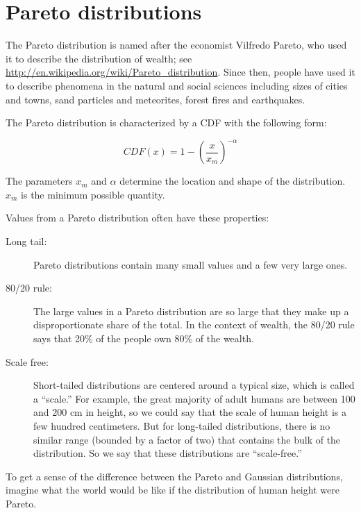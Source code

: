 \documentclass[10pt]{book}
\begin{document}
\section{Pareto distributions}

The Pareto distribution is named after the economist Vilfredo
Pareto, who used it to describe the distribution of wealth;
see \url{http://en.wikipedia.org/wiki/Pareto_distribution}.  Since then,
people have used it to describe
phenomena in the natural and social sciences
including sizes of cities and towns, sand particles
and meteorites, forest fires and earthquakes.

The Pareto distribution is characterized by a CDF with the following
form:

\[ CDF(x) = 1- \left( \frac{x}{x_m} \right) ^{-\alpha} \]

The parameters $x_m$ and $\alpha$ determine the location and shape of
the distribution.  $x_m$ is the minimum possible quantity.

Values from a Pareto distribution often have these properties:

\begin{description}

\item[Long tail:] Pareto distributions contain many small values
and a few very large ones.

\item[80/20 rule:] The large values in a Pareto distribution are
so large that they make up a disproportionate share of the total.
In the context of wealth, the 80/20 rule says that 20\% of the
people own 80\% of the wealth.

\item[Scale free:] Short-tailed distributions are centered around
a typical size, which is called a ``scale.''  For example, the
great majority of adult humans are between 100 and 200 cm in height,
so we could say that the scale of human height is a few hundred
centimeters.  But for long-tailed distributions, there is no
similar range (bounded by a factor of two) that contains the
bulk of the distribution.  So we say that these distributions
are ``scale-free.''

\end{description}

To get a sense of the difference between the Pareto and Gaussian
distributions, imagine what the world would be like if the
distribution of human height were Pareto.
\end{document}
